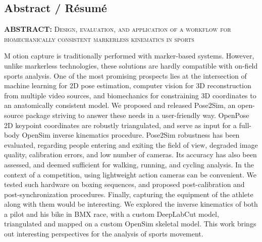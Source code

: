 {}

\vspace*{-1.6cm}
\begin{flushright}
\section*{\fontsize{20pt}{20pt}\selectfont\textnormal{Abstract / Résumé}}
\end{flushright}
\vspace{-.2cm}

\chead[\fancyplain{}{}]
      {\fancyplain{}{}}
\lfoot[\fancyplain{}{}]%
      {\fancyplain{}{}}
\cfoot[\fancyplain{}{\thepage}]
      {\fancyplain{}{\thepage}}
\rfoot[\fancyplain{}{}]%
     {\fancyplain{}{\scriptsize}}
     


\vspace*{1cm}

\noindent\textbf{ABSTRACT: } \textsc{Design, evaluation, and application of a workflow for biomechanically consistent markerless kinematics in sports}

\lettrine[lines=1]{M}{ }otion capture is traditionally performed with marker-based systems. However, unlike markerless technologies, these solutions are hardly compatible with on-field sports analysis. One of the most promising prospects lies at the intersection of machine learning for 2D pose estimation, computer vision for 3D reconstruction from multiple video sources, and biomechanics for constraining 3D coordinates to an anatomically consistent model. We proposed and released Pose2Sim, an open-source package striving to answer these needs in a user-friendly way. OpenPose 2D keypoint coordinates are robustly triangulated, and serve as input for a full-body OpenSim inverse kinematics procedure. Pose2Sim robustness has been evaluated, regarding people entering and exiting the field of view, degraded image quality, calibration errors, and low number of cameras. Its accuracy has also been assessed, and deemed sufficient for walking, running, and cycling analysis. In the context of a competition, using lightweight action cameras can be convenient. We tested such hardware on boxing sequences, and proposed post-calibration and post-synchronization procedures. Finally, capturing the equipment of the athlete along with them would be interesting. We explored the inverse kinematics of both a pilot and his bike in BMX race, with a custom DeepLabCut model, triangulated and mapped on a custom OpenSim skeletal model. This work brings out interesting perspectives for the analysis of sports movement.

